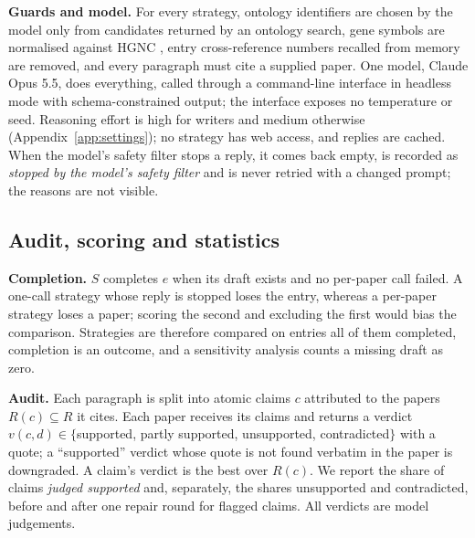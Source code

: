 \documentclass{article} %
\begin{document}
\textbf{Guards and model.} For every strategy, ontology identifiers are chosen by the model only from candidates returned by an ontology search, gene symbols are normalised against HGNC \citep{seal2023genenames}, entry cross-reference numbers recalled from memory are removed, and every paragraph must cite a supplied paper. One model, Claude Opus 5.5, does everything, called through a command-line interface in headless mode with schema-constrained output; the interface exposes no temperature or seed. Reasoning effort is high for writers and medium otherwise (Appendix~\ref{app:settings}); no strategy has web access, and replies are cached. When the model's safety filter stops a reply, it comes back empty, is recorded as \emph{stopped by the model's safety filter} and is never retried with a changed prompt; the reasons are not visible.

\subsection{Audit, scoring and statistics}
\label{sec:scoring}
\textbf{Completion.} $S$ completes $e$ when its draft exists and no per-paper call failed. A one-call strategy whose reply is stopped loses the entry, whereas a per-paper strategy loses a paper; scoring the second and excluding the first would bias the comparison. Strategies are therefore compared on entries all of them completed, completion is an outcome, and a sensitivity analysis counts a missing draft as zero.

\textbf{Audit.} Each paragraph is split into atomic claims $c$ attributed to the papers $R(c)\subseteq R$ it cites. Each paper receives its claims and returns a verdict $v(c,d)\in\{$supported, partly supported, unsupported, contradicted$\}$ with a quote; a ``supported'' verdict whose quote is not found verbatim in the paper is downgraded. A claim's verdict is the best over $R(c)$. We report the share of claims \emph{judged supported} and, separately, the shares unsupported and contradicted, before and after one repair round for flagged claims. All verdicts are model judgements.
\end{document}
